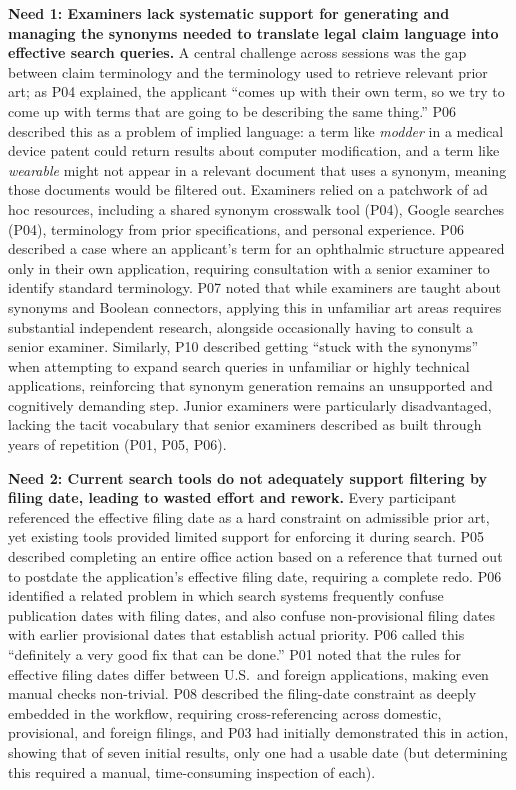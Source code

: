 \documentclass[sigconf]{acmart}
\begin{document}
\smallskip\noindent\textbf{Need 1: Examiners lack systematic support for
generating and managing the synonyms needed to translate legal claim language
into effective search queries.}
A central challenge across sessions was the gap between claim terminology and
the terminology used to retrieve relevant prior art; as P04 explained, the
applicant ``comes up with their own term, so we try to come up with terms
that are going to be describing the same thing.'' P06 described this as a
problem of implied language: a term like \emph{modder} in a medical device
patent could return results about computer modification, and a term like
\emph{wearable} might not appear in a relevant document that uses a synonym,
meaning those documents would be filtered out. Examiners relied on a patchwork
of ad hoc resources, including a shared synonym crosswalk tool (P04), Google
searches (P04), terminology from prior specifications, and personal
experience. P06 described a case where an applicant's term for an ophthalmic
structure appeared only in their own application, requiring consultation with
a senior examiner to identify standard terminology. P07 noted that while
examiners are taught about synonyms and Boolean connectors, applying this in
unfamiliar art areas requires substantial independent research, alongside
occasionally having to consult a senior examiner. Similarly, P10 described
getting ``stuck with the synonyms'' when attempting to expand search queries
in unfamiliar or highly technical applications, reinforcing that synonym
generation remains an unsupported and cognitively demanding step. Junior
examiners were particularly disadvantaged, lacking the tacit vocabulary that
senior examiners described as built through years of repetition (P01, P05,
P06).

\smallskip\noindent\textbf{Need 2: Current search tools do not adequately
support filtering by filing date, leading to wasted effort and rework.}
Every participant referenced the effective filing date as a hard constraint on
admissible prior art, yet existing tools provided limited support for
enforcing it during search. P05 described completing an entire office action
based on a reference that turned out to postdate the application's effective
filing date, requiring a complete redo. P06 identified a related problem in
which search systems frequently confuse publication dates with filing dates,
and also confuse non-provisional filing dates with earlier provisional dates
that establish actual priority. P06 called this ``definitely a very good fix
that can be done.'' P01 noted that the rules for effective filing dates differ
between U.S.\ and foreign applications, making even manual checks non-trivial.
P08 described the filing-date constraint as deeply embedded in the workflow,
requiring cross-referencing across domestic, provisional, and foreign filings,
and P03 had initially demonstrated this in action, showing that of seven
initial results, only one had a usable date (but determining this required a
manual, time-consuming inspection of each).
\end{document}
